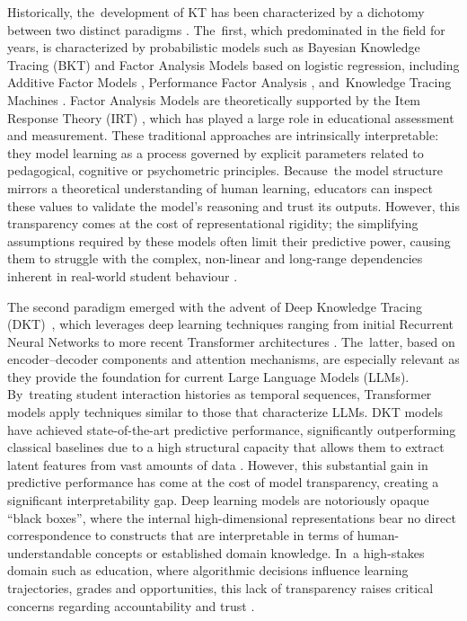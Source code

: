 \documentclass[applsci,article,accept,moreauthors,pdftex]{Definitions/mdpi}
\begin{document}
{Historically, the~development of KT has been characterized by a dichotomy between two distinct paradigms {\citep{abdelrahman2023knowledge}}. The~first, which predominated in the field for years, is characterized by probabilistic models such as Bayesian Knowledge Tracing (BKT) {\citep{corbett1994knowledge}} and Factor Analysis Models based on logistic regression, including Additive Factor Models {\citep{cen2008comparing}}, Performance Factor Analysis {\citep{pavlik2009performance}}, and~Knowledge Tracing Machines {\citep{vie2019knowledge}}. Factor Analysis Models are theoretically supported by the Item Response Theory (IRT) {\citep{embretson2013item}}, which has played a large role in educational assessment and measurement. These traditional approaches are intrinsically interpretable: they model learning as a process governed by explicit parameters related to pedagogical, cognitive or psychometric principles. Because~the model structure mirrors a theoretical understanding of human learning, educators can inspect these values to validate the model's reasoning and trust its outputs. However, this transparency comes at the cost of representational rigidity; the simplifying assumptions required by these models often limit their predictive power, causing them to struggle with the complex, non-linear and long-range dependencies inherent in real-world student behaviour {\citep{twenty_five_years_of_bkt}}.}

{The second paradigm emerged with the advent of Deep Knowledge Tracing (DKT)~{\citep{piech2015deep}}, which leverages deep learning techniques ranging from initial Recurrent Neural Networks to more recent Transformer architectures {\citep{vaswani2017attention}}. The~latter, based on encoder--decoder components and attention mechanisms, are especially relevant as they provide the foundation for current Large Language Models (LLMs). By~treating student interaction histories as temporal sequences, Transformer models apply techniques similar to those that characterize LLMs. DKT models have achieved state-of-the-art predictive performance, significantly outperforming classical baselines due to a high structural capacity that allows them to extract latent features from vast amounts of data {\citep{abdelrahman2023knowledge}}. However, this substantial gain in predictive performance has come at the cost of model transparency, creating a significant interpretability gap. Deep learning models are notoriously opaque ``black boxes'', where the internal high-dimensional representations bear no direct correspondence to constructs that are interpretable in terms of human-understandable concepts or established domain knowledge. In~a high-stakes domain such as education, where algorithmic decisions influence learning trajectories, grades and opportunities, this lack of transparency raises critical concerns regarding accountability and trust {\citep{Holmes2022504}}.}
\end{document}

